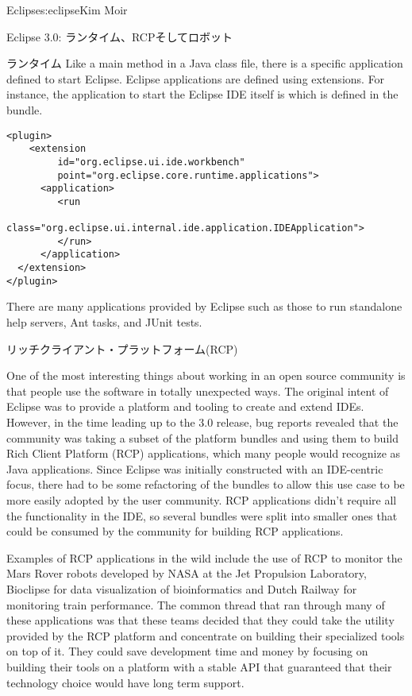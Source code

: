 \begin{aosachapter}{Eclipse}{s:eclipse}{Kim Moir}
\begin{aosasect1}{Eclipse 3.0: ランタイム、RCPそしてロボット}
\begin{aosasect2}{ランタイム}
Like a main method in a Java class file, there is a specific
application defined to start Eclipse. Eclipse applications are defined
using extensions. For instance, the application to start the Eclipse
IDE itself is  which is defined in the
 bundle.

\begin{verbatim}
<plugin>
    <extension
         id="org.eclipse.ui.ide.workbench"
         point="org.eclipse.core.runtime.applications">
      <application>
         <run
               class="org.eclipse.ui.internal.ide.application.IDEApplication">
         </run>
      </application>
  </extension>
</plugin>
\end{verbatim}

There are many applications provided by Eclipse such as those to run
standalone help servers, Ant tasks, and JUnit tests.

\end{aosasect2}

\begin{aosasect2}{リッチクライアント・プラットフォーム(RCP)}

One of the most interesting things about working in an open source
community is that people use the software in totally unexpected ways.
The original intent of Eclipse was to provide a platform and tooling
to create and extend IDEs.  However, in the time leading up to the 3.0
release, bug reports revealed that the community was taking a subset
of the platform bundles and using them to build Rich Client Platform
(RCP) applications, which many people would recognize as Java applications.  Since Eclipse was initially constructed with an
IDE-centric focus, there had to be some refactoring of the bundles to
allow this use case to be more easily adopted by the user
community. RCP applications didn't require all the functionality in
the IDE, so several bundles were split into smaller ones that could be
consumed by the community for building RCP applications.  

Examples of RCP applications in the wild include the use of RCP to monitor the
Mars Rover robots developed by NASA at the Jet Propulsion Laboratory,
Bioclipse for data visualization of bioinformatics and Dutch Railway
for monitoring train performance.  The common thread that ran through
many of these applications was that these teams decided that they
could take the utility provided by the RCP platform and concentrate on
building their specialized tools on top of it. They could save
development time and money by focusing on building their tools on a
platform with a stable API that guaranteed that their technology
choice would have long term support.


\end{aosasect2}
\end{aosasect1}
\end{aosachapter}

